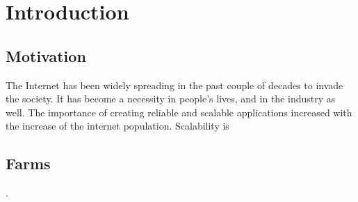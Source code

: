 \chapter{Introduction}
\label{chap:intro}

\section{Motivation} \label{sec:s1}
The Internet has been widely spreading in the past couple of decades to invade the society. It has become a necessity in people's lives, and in the industry as well. The importance of creating reliable and scalable applications increased with the increase of the internet population. Scalability is  

\section{Farms} \label{sec:s2}
.
